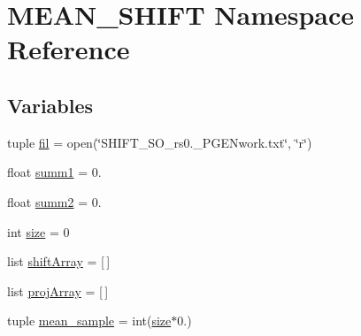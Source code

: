 \hypertarget{namespaceMEAN__SHIFT}{\section{M\-E\-A\-N\-\_\-\-S\-H\-I\-F\-T Namespace Reference}
\label{namespaceMEAN__SHIFT}
}
\subsection*{Variables}
\begin{DoxyCompactItemize}
\item 
tuple \hyperlink{namespaceMEAN__SHIFT_a8d3baad9fa0bb397ed36b32af03a996c}{fil} = open(\char`\"{}S\-H\-I\-F\-T\-\_\-S\-O\-\_\-rs0.\-\_\-\-P\-G\-E\-Nwork.\-txt\char`\"{}, \char`\"{}r\char`\"{})
\item 
float \hyperlink{namespaceMEAN__SHIFT_ab363dbe83b6b64b4094afc53344d26e5}{summ1} = 0.
\item 
float \hyperlink{namespaceMEAN__SHIFT_a7b21170da1a790f9557c94ababdcec64}{summ2} = 0.
\item 
int \hyperlink{namespaceMEAN__SHIFT_af4d778da1742ea5b786bd8206225d49c}{size} = 0
\item 
list \hyperlink{namespaceMEAN__SHIFT_acb855d2b8fde0351f8cc49e8f804fdce}{shift\-Array} = \mbox{[}$\,$\mbox{]}
\item 
list \hyperlink{namespaceMEAN__SHIFT_acb79b39dec43809410d06cd50001c6cc}{proj\-Array} = \mbox{[}$\,$\mbox{]}
\item 
tuple \hyperlink{namespaceMEAN__SHIFT_a082081f2418662ad1850a0ac0178eb19}{mean\-\_\-sample} = int(\hyperlink{namespaceMEAN__SHIFT_af4d778da1742ea5b786bd8206225d49c}{size}$\ast$0.)
\end{DoxyCompactItemize}


